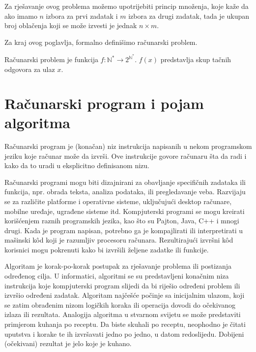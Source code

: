 Za rješavanje ovog problema možemo upotrijebiti princip množenja, koje kaže da ako imamo $ n$ izbora za prvi zadatak i $m$ izbora za drugi zadatak, tada je ukupan broj oblačenja koji se može izvesti je jednak  $n \times m$.

Za kraj ovog poglavlja, formalno definišimo računarski problem.

\begin{definition}
	Računarski problem je funkcija $f \colon \mathbb{N}^* \rightarrow 2^{\mathbb{N}^*}$. $f (x)$ predstavlja skup tačnih odgovora  za ulaz $x$.
\end{definition} 
 
\section{Računarski program i pojam algoritma}

Računarski program je (konačan) niz instrukcija napisanih u nekom programskom jeziku koje računar  može da izvrši. Ove instrukcije govore računaru šta da radi i kako da to uradi u eksplicitno definisanom nizu.

Računarski programi mogu biti dizajnirani za obavljanje specifičnih zadataka ili funkcija,  npr. obrada teksta, analiza podataka,  ili pregledavanje veba.  Razvijaju se za različite platforme i operativne sisteme, uključujući desktop računare, mobilne uređaje, ugrađene sisteme itd.  Kompjuterski programi se mogu kreirati korišćenjem raznih programskih jezika, kao što su Pajton, Java, C++  i mnogi drugi. Kada je program napisan, potrebno ga je kompajlirati ili interpretirati u mašinski k\^od koji je razumljiv procesoru računara. Rezultirajući izvršni k\^od korisnici mogu pokrenuti kako bi izvršili željene zadatke ili funkcije.

Algoritam je  korak-po-korak postupak za rješavanje problema ili postizanja određenog   cilja. U informatici, algoritmi se su predstavljeni konačnim  niza instrukcija koje kompjuterski program slijedi da bi riješio određeni problem ili izvršio određeni zadatak. Algoritam najčešće počinje sa inicijalnim ulazom, koji se zatim obrađenim nizom logičkih koraka ili operacija dovodi do očekivanog izlaza ili rezultata.  Analogija algoritma u stvarnom svijetu se može predstaviti primjerom kuhanja po receptu. Da biste skuhali po receptu, neophodno je čitati uputstva i korake te ih izvršavati jedno po jedno, u datom redoslijedu. Dobijeni (očekivani) rezultat je jelo koje je kuhano.  

